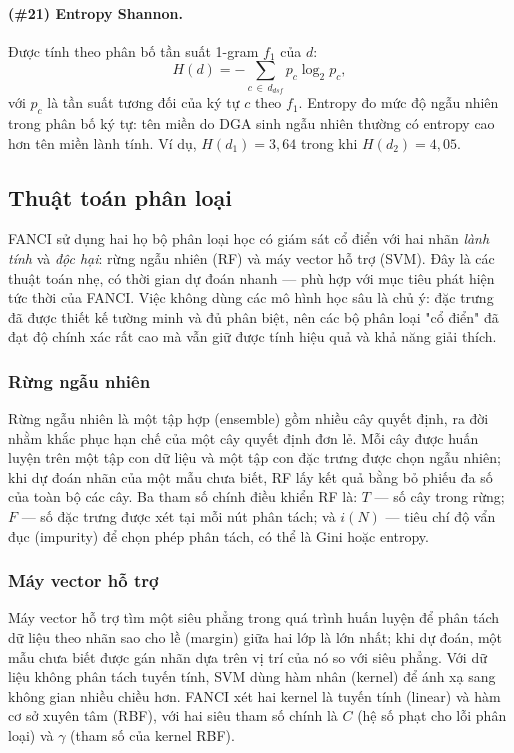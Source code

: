 \paragraph{(\#21) Entropy Shannon.} Được tính theo phân bố tần suất 1-gram $f_1$ của $d$:
\begin{equation}
H(d) = -\sum_{c \,\in\, d_{dsf}} p_c \log_2 p_c,
\end{equation}
với $p_c$ là tần suất tương đối của ký tự $c$ theo $f_1$. Entropy đo mức độ ngẫu nhiên trong phân bố ký tự: tên miền do DGA sinh ngẫu nhiên thường có entropy cao hơn tên miền lành tính. Ví dụ, $H(d_1) = 3{,}64$ trong khi $H(d_2) = 4{,}05$.

\subsection{Thuật toán phân loại}\label{sec:thuat-toan}

FANCI sử dụng hai họ bộ phân loại học có giám sát cổ điển với hai nhãn \textit{lành tính} và \textit{độc hại}: rừng ngẫu nhiên (RF) và máy vector hỗ trợ (SVM). Đây là các thuật toán nhẹ, có thời gian dự đoán nhanh --- phù hợp với mục tiêu phát hiện tức thời của FANCI. Việc không dùng các mô hình học sâu là chủ ý: đặc trưng đã được thiết kế tường minh và đủ phân biệt, nên các bộ phân loại "cổ điển" đã đạt độ chính xác rất cao mà vẫn giữ được tính hiệu quả và khả năng giải thích.

\subsubsection{Rừng ngẫu nhiên}

Rừng ngẫu nhiên \cite{ho1995random,breiman2001random} là một tập hợp (ensemble) gồm nhiều cây quyết định, ra đời nhằm khắc phục hạn chế của một cây quyết định đơn lẻ. Mỗi cây được huấn luyện trên một tập con dữ liệu và một tập con đặc trưng được chọn ngẫu nhiên; khi dự đoán nhãn của một mẫu chưa biết, RF lấy kết quả bằng bỏ phiếu đa số của toàn bộ các cây. Ba tham số chính điều khiển RF là: $T$ --- số cây trong rừng; $F$ --- số đặc trưng được xét tại mỗi nút phân tách; và $i(N)$ --- tiêu chí độ vẩn đục (impurity) để chọn phép phân tách, có thể là Gini hoặc entropy.

\subsubsection{Máy vector hỗ trợ}

Máy vector hỗ trợ \cite{cortes1995support} tìm một siêu phẳng trong quá trình huấn luyện để phân tách dữ liệu theo nhãn sao cho lề (margin) giữa hai lớp là lớn nhất; khi dự đoán, một mẫu chưa biết được gán nhãn dựa trên vị trí của nó so với siêu phẳng. Với dữ liệu không phân tách tuyến tính, SVM dùng hàm nhân (kernel) để ánh xạ sang không gian nhiều chiều hơn. FANCI xét hai kernel là tuyến tính (linear) và hàm cơ sở xuyên tâm (RBF), với hai siêu tham số chính là $C$ (hệ số phạt cho lỗi phân loại) và $\gamma$ (tham số của kernel RBF).

